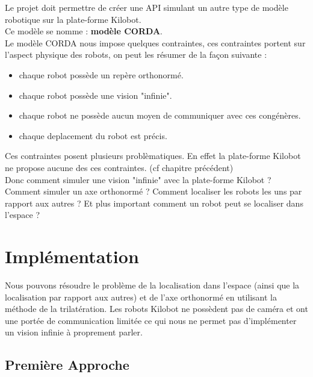 \documentclass[a4paper,8pt]{report}
\begin{document}
Le projet doit permettre de cr\'eer une API simulant un autre type de mod\`ele robotique sur la plate-forme Kilobot.\\
Ce mod\`ele se nomme : \textbf{mod\`ele CORDA}.\\
Le mod\`ele CORDA nous impose quelques contraintes, ces contraintes portent sur l'aspect physique des robots, on peut les r\'esumer de la fa\c con suivante : \\

\begin{itemize}
\item chaque robot poss\`ede un rep\`ere orthonorm\'e.
\item chaque robot poss\`ede une vision "infinie".
\item chaque robot ne poss\`ede aucun moyen de communiquer avec ces cong\'en\`eres.
\item chaque deplacement du robot est pr\'ecis.
\end{itemize}

\medskip
Ces contraintes posent plusieurs probl\`ematiques. En effet la plate-forme Kilobot ne propose aucune des ces contraintes. (cf chapitre pr\'ec\'edent)\\
Donc comment simuler une vision "infinie" avec la plate-forme Kilobot ? Comment simuler un axe orthonorm\'e ? Comment localiser les robots les uns par rapport aux autres ? Et plus important comment un robot peut se localiser dans l'espace ?\\


\section*{Impl\'ementation}\label{sec:name}

Nous pouvons r\'esoudre le probl\`eme de la localisation dans l'espace (ainsi que la localisation par rapport aux autres) et de l'axe orthonorm\'e en utilisant la m\'ethode de la trilat\'eration. Les robots Kilobot ne poss\`edent pas de cam\'era et ont une port\'ee de communication limit\'ee ce qui nous ne permet pas d'impl\'ementer un vision infinie \`a proprement parler.\\

\subsection*{Premi\`ere Approche}\label{sec:name}
\end{document}
